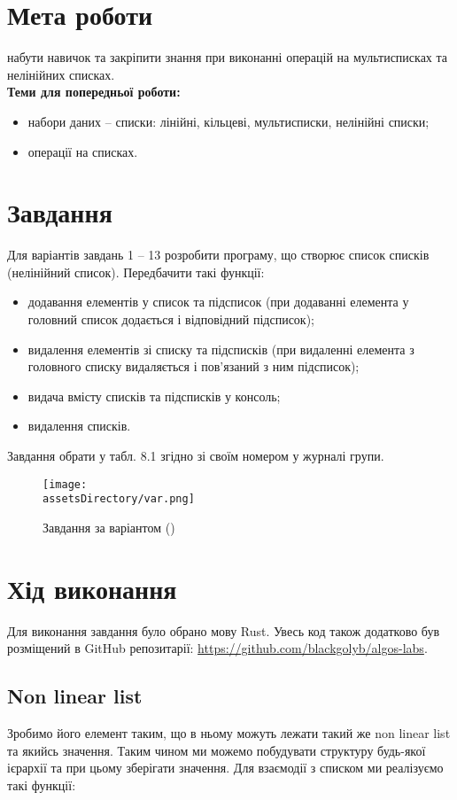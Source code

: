 \section{Мета роботи}
набути навичок та закріпити знання при виконанні операцій на
мультисписках та нелінійних списках.
\\

\noindent
\textbf{Теми для попередньої роботи:}
\begin{itemize}
    \item набори даних – списки: лінійні, кільцеві, мультисписки, нелінійні списки;
    \item операції на списках.
\end{itemize}



\section{Завдання}
Для варіантів завдань 1 – 13 розробити програму, що створює список
списків (нелінійний список). Передбачити такі функції:
\begin{itemize}
    \item додавання елементів у список та підсписок (при додаванні елемента у головний список додається і відповідний підсписок);
    \item видалення елементів зі списку та підсписків (при видаленні елемента з головного списку видаляється і пов’язаний з ним підсписок);
    \item видача вмісту списків та підсписків у консоль;
    \item видалення списків.
\end{itemize}
Завдання обрати у табл. 8.1 згідно зі своїм номером у журналі групи.

\begin{figure}[ht!]
    \centering
    \texttt{[image: \\assetsDirectory/var.png]}
    \caption{Завдання за варіантом (\variant)}
\end{figure}



\section{Хід виконання}
Для виконання завдання було обрано мову Rust.
Увесь код також додатково був розміщений в GitHub репозитарії: \href{https://github.com/blackgolyb/algos-labs}{https://github.com/blackgolyb/algos-labs}.


\newpage
\subsection{Non linear list}
Зробимо його елемент таким, що в ньому можуть лежати такий же non linear list та якийсь значення.
Таким чином ми можемо побудувати структуру будь-якої ієрархії та при цьому зберігати значення.
Для взаємодії з списком ми реалізуємо такі функції:

